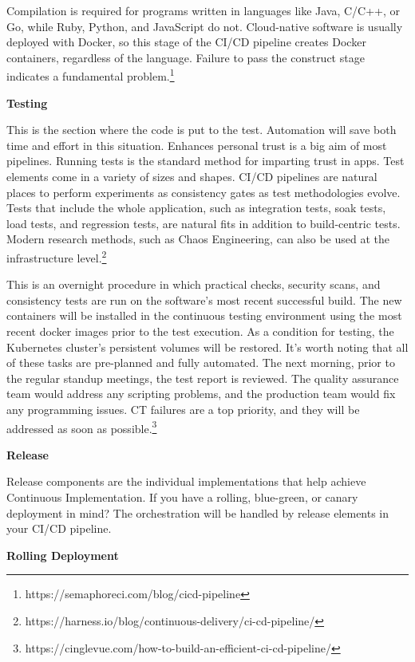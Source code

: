 Compilation is required for programs written in languages like Java, C/C++, or Go, while Ruby, Python, and JavaScript do not. Cloud-native software is usually deployed with Docker, so this stage of the CI/CD pipeline creates Docker containers, regardless of the language. Failure to pass the construct stage indicates a fundamental problem.\footnote{https://semaphoreci.com/blog/cicd-pipeline}


\textbf{Testing}


This is the section where the code is put to the test. Automation will save both time and effort in this situation. Enhances personal trust is a big aim of most pipelines. Running tests is the standard method for imparting trust in apps. Test elements come in a variety of sizes and shapes. CI/CD pipelines are natural places to perform experiments as consistency gates as test methodologies evolve. Tests that include the whole application, such as integration tests, soak tests, load tests, and regression tests, are natural fits in addition to build-centric tests. Modern research methods, such as Chaos Engineering, can also be used at the infrastructure level.\footnote{https://harness.io/blog/continuous-delivery/ci-cd-pipeline/}

This is an overnight procedure in which practical checks, security scans, and consistency tests are run on the software's most recent successful build. The new containers will be installed in the continuous testing environment using the most recent docker images prior to the test execution. As a condition for testing, the Kubernetes cluster's persistent volumes will be restored. It's worth noting that all of these tasks are pre-planned and fully automated. The next morning, prior to the regular standup meetings, the test report is reviewed. The quality assurance team would address any scripting problems, and the production team would fix any programming issues. CT failures are a top priority, and they will be addressed as soon as possible.\footnote{https://cinglevue.com/how-to-build-an-efficient-ci-cd-pipeline/}

\textbf{Release}


Release components are the individual implementations that help achieve Continuous Implementation. If you have a rolling, blue-green, or canary deployment in mind? The orchestration will be handled by release elements in your CI/CD pipeline.


\hspace{10mm} \textbf{Rolling Deployment}


